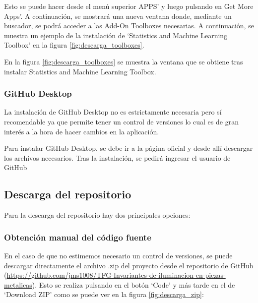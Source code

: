 Esto se puede hacer desde el menú superior APPS' y luego pulsando en Get More Apps'. A continuación, se mostrará una nueva ventana donde, mediante un buscador, se podrá acceder a las Add-On Toolboxes necesarias. A continuación, se muestra un ejemplo de la instalación de `Statistics and Machine Learning Toolbox' en la figura \ref{fig:descarga_toolboxes}.


En la figura \ref{fig:descarga_toolboxes} se muestra la ventana que se obtiene tras instalar Statistics and Machine Learning Toolbox.

\subsubsection{GitHub Desktop}\label{github-desktop}

La instalación de GitHub Desktop no es estrictamente necesaria pero sí recomendable ya que permite tener un control de versiones lo cual es de gran interés a la hora de hacer cambios en la aplicación.

Para instalar GitHub Desktop, se debe ir a la página oficial \cite{githubDesktop} y desde allí descargar los archivos necesarios. Tras la instalación, se pedirá ingresar el usuario de GitHub

\subsection{Descarga del repositorio}\label{descarga-del-repositorio}

Para la descarga del repositorio hay dos principales opciones:

\subsubsection{Obtención manual del código fuente}\label{obtención-manual-del-código-fuente}

En el caso de que no estimemos necesario un control de versiones, se puede descargar directamente el archivo .zip del proyecto desde el repositorio de GitHub (\url{https://github.com/jms1008/TFG-Invariantes-de-iluminacion-en-piezas-metalicas}). Esto se realiza pulsando en el botón `Code' y más tarde en el de `Download ZIP' como se puede ver en la figura \ref{fig:descarga_zip}:


